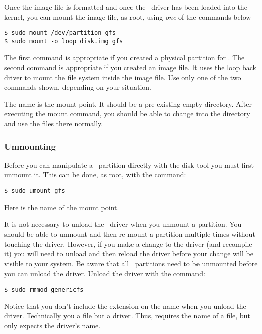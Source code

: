 Once the image file is formatted and once the \GenericFS\ driver has been loaded into the
kernel, you can mount the image file, as root, using \emph{one} of the commands below
\begin{verbatim}
$ sudo mount /dev/partition gfs
$ sudo mount -o loop disk.img gfs
\end{verbatim}

The first command is appropriate if you created a physical partition for \GenericFS. The second
command is appropriate if you created an image file. It uses the loop back driver to mount the
file system inside the image file. Use only one of the two commands shown, depending on your
situation.

The name  is the mount point. It should be a pre-existing empty directory. After
executing the mount command, you should be able to change into the  directory and
use the files there normally.

\subsubsection{Unmounting}

Before you can manipulate a \GenericFS\ partition directly with the disk tool you must first
unmount it. This can be done, as root, with the command:
\begin{verbatim}
$ sudo umount gfs
\end{verbatim}

Here  is the name of the mount point.

It is not necessary to unload the \GenericFS\ driver when you unmount a partition. You should be
able to unmount and then re-mount a partition multiple times without touching the driver.
However, if you make a change to the driver (and recompile it) you will need to unload and then
reload the driver before your change will be visible to your system. Be aware that all
\GenericFS\ partitions need to be unmounted before you can unload the driver. Unload the driver
with the command:
\begin{verbatim}
$ sudo rmmod genericfs
\end{verbatim}

Notice that you don't include the  extension on the name when you unload the
driver. Technically you  a file but  a driver. Thus,
 requires the name of a file, but  only expects the driver's
name.

